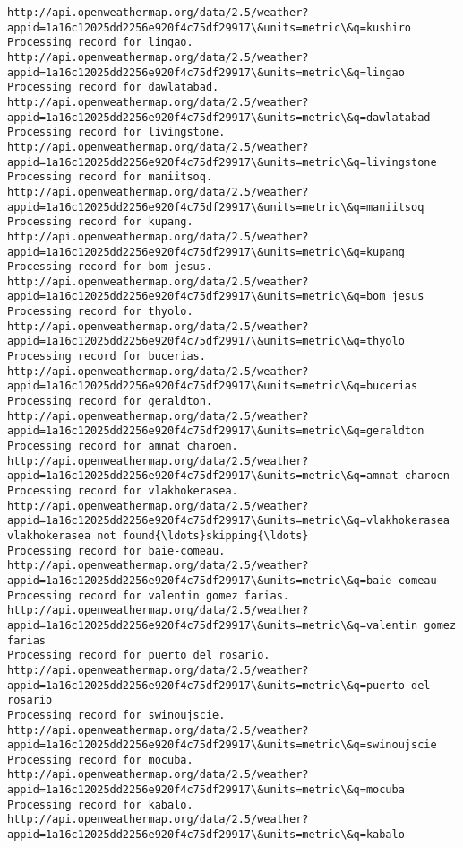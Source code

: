 \documentclass[11pt]{article}
\begin{document}
\begin{Verbatim}[commandchars=\\\{\}]
http://api.openweathermap.org/data/2.5/weather?appid=1a16c12025dd2256e920f4c75df29917\&units=metric\&q=kushiro
Processing record for lingao.
http://api.openweathermap.org/data/2.5/weather?appid=1a16c12025dd2256e920f4c75df29917\&units=metric\&q=lingao
Processing record for dawlatabad.
http://api.openweathermap.org/data/2.5/weather?appid=1a16c12025dd2256e920f4c75df29917\&units=metric\&q=dawlatabad
Processing record for livingstone.
http://api.openweathermap.org/data/2.5/weather?appid=1a16c12025dd2256e920f4c75df29917\&units=metric\&q=livingstone
Processing record for maniitsoq.
http://api.openweathermap.org/data/2.5/weather?appid=1a16c12025dd2256e920f4c75df29917\&units=metric\&q=maniitsoq
Processing record for kupang.
http://api.openweathermap.org/data/2.5/weather?appid=1a16c12025dd2256e920f4c75df29917\&units=metric\&q=kupang
Processing record for bom jesus.
http://api.openweathermap.org/data/2.5/weather?appid=1a16c12025dd2256e920f4c75df29917\&units=metric\&q=bom jesus
Processing record for thyolo.
http://api.openweathermap.org/data/2.5/weather?appid=1a16c12025dd2256e920f4c75df29917\&units=metric\&q=thyolo
Processing record for bucerias.
http://api.openweathermap.org/data/2.5/weather?appid=1a16c12025dd2256e920f4c75df29917\&units=metric\&q=bucerias
Processing record for geraldton.
http://api.openweathermap.org/data/2.5/weather?appid=1a16c12025dd2256e920f4c75df29917\&units=metric\&q=geraldton
Processing record for amnat charoen.
http://api.openweathermap.org/data/2.5/weather?appid=1a16c12025dd2256e920f4c75df29917\&units=metric\&q=amnat charoen
Processing record for vlakhokerasea.
http://api.openweathermap.org/data/2.5/weather?appid=1a16c12025dd2256e920f4c75df29917\&units=metric\&q=vlakhokerasea
vlakhokerasea not found{\ldots}skipping{\ldots}
Processing record for baie-comeau.
http://api.openweathermap.org/data/2.5/weather?appid=1a16c12025dd2256e920f4c75df29917\&units=metric\&q=baie-comeau
Processing record for valentin gomez farias.
http://api.openweathermap.org/data/2.5/weather?appid=1a16c12025dd2256e920f4c75df29917\&units=metric\&q=valentin gomez farias
Processing record for puerto del rosario.
http://api.openweathermap.org/data/2.5/weather?appid=1a16c12025dd2256e920f4c75df29917\&units=metric\&q=puerto del rosario
Processing record for swinoujscie.
http://api.openweathermap.org/data/2.5/weather?appid=1a16c12025dd2256e920f4c75df29917\&units=metric\&q=swinoujscie
Processing record for mocuba.
http://api.openweathermap.org/data/2.5/weather?appid=1a16c12025dd2256e920f4c75df29917\&units=metric\&q=mocuba
Processing record for kabalo.
http://api.openweathermap.org/data/2.5/weather?appid=1a16c12025dd2256e920f4c75df29917\&units=metric\&q=kabalo

\end{Verbatim}
\end{document}
